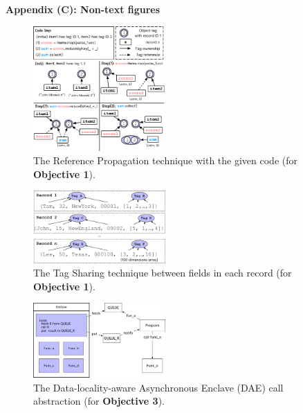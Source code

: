 \documentclass[9pt,a4]{article}
\begin{document}
\textbf{Appendix (C): Non-text figures}
\vspace{0.2in}

\begin{figure}[h]
   \center
\includegraphics[width=0.45\textwidth]{figures/reference}
\caption{The Reference Propagation technique with the given code (for 
\textbf{Objective 1}).}
\label{fig:reference}
\end{figure}
\vspace{0.2in}

\begin{figure}[h]
   \center
\includegraphics[width=0.45\textwidth]{figures/tagcache}
\caption{The Tag Sharing technique between fields in each record (for 
\textbf{Objective 1}).}
\label{fig:tagcache}
\end{figure}
\vspace{0.2in}

\begin{figure}[h]
   \center
   \includegraphics[width=0.45\textwidth]{figures/async_call}
 \caption{The Data-locality-aware Asynchronous Enclave (DAE) call abstraction 
(for 
\textbf{Objective 3}).}
   \label{fig:async-call}
 \end{figure}

% 
% 

\end{document}
